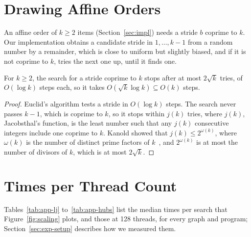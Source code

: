 \appendix

\section{Drawing Affine Orders}
\label{sec:app-affine}

An affine order of $k \geq 2$ items (Section~\ref{sec:impl}) needs a stride $b$ coprime to $k$. Our implementation obtains a candidate stride in $1, \ldots, k-1$ from a random number by a remainder, which is close to uniform but slightly biased, and if it is not coprime to $k$, tries the next one up, until it finds one.

\begin{lemma}
\label{lem:affine}
For $k \geq 2$, the search for a stride coprime to $k$ stops after at most $2\sqrt{k}$ tries, of $O(\log k)$ steps each, so it takes $O(\sqrt{k}\log k) \subseteq O(k)$ steps.
\end{lemma}
\begin{proof}
Euclid's algorithm tests a stride in $O(\log k)$ steps. The search never passes $k-1$, which is coprime to $k$, so it stops within $j(k)$ tries, where $j(k)$, Jacobsthal's function, is the least number such that any $j(k)$ consecutive integers include one coprime to $k$. Kanold showed that $j(k) \leq 2^{\omega(k)}$, where $\omega(k)$ is the number of distinct prime factors of $k$~\cite{kanold_jacobsthal}, and $2^{\omega(k)}$ is at most the number of divisors of $k$, which is at most $2\sqrt{k}$.
\end{proof}

\section{Times per Thread Count}
\label{sec:app-times}

Tables~\ref{tab:app-lj} to~\ref{tab:app-hubs} list the median times per search that Figure~\ref{fig:scaling} plots, and those at 128 threads, for every graph and program; Section~\ref{sec:exp-setup} describes how we measured them.


